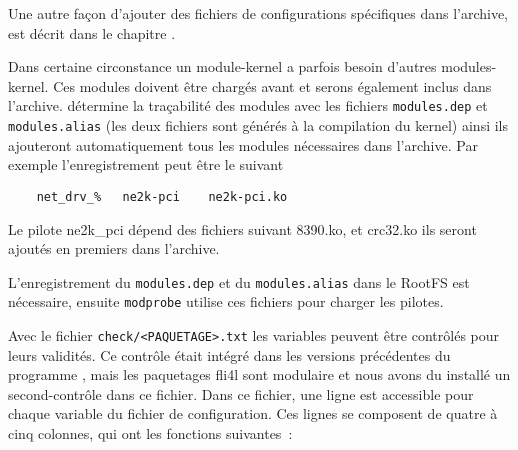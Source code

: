 Une autre façon d’ajouter des fichiers de configurations spécifiques dans
l'archive, est décrit dans le chapitre
.



Dans certaine circonstance un module-kernel a parfois besoin d'autres modules-kernel.
Ces modules doivent être chargés avant et serons également inclus dans l'archive.
 détermine la traçabilité des modules avec les fichiers
\texttt{modules.dep} et \texttt{modules.alias} (les deux fichiers sont générés à la
compilation du kernel) ainsi ils ajouteront automatiquement tous les modules
nécessaires dans l’archive. Par exemple l’enregistrement peut être le suivant

\begin{example}
\begin{verbatim}
    net_drv_%   ne2k-pci    ne2k-pci.ko
\end{verbatim}
\end{example}

Le pilote ne2k\_pci dépend des fichiers suivant 8390.ko, et crc32.ko ils seront
ajoutés en premiers dans l'archive.

L’enregistrement du \texttt{modules.dep} et du \texttt{modules.alias} dans le RootFS
est nécessaire, ensuite \texttt{modprobe} utilise ces fichiers pour charger les pilotes.


Avec le fichier \texttt{check/<PAQUETAGE>.txt} les variables peuvent être contrôlés
pour leurs validités. Ce contrôle était intégré dans les versions précédentes
du programme , mais les paquetages fli4l sont modulaire et nous avons
du installé un second-contrôle dans ce fichier. Dans ce fichier, une ligne est
accessible pour chaque variable du fichier de configuration. Ces lignes se composent
de quatre à cinq colonnes, qui ont les fonctions suivantes~:

